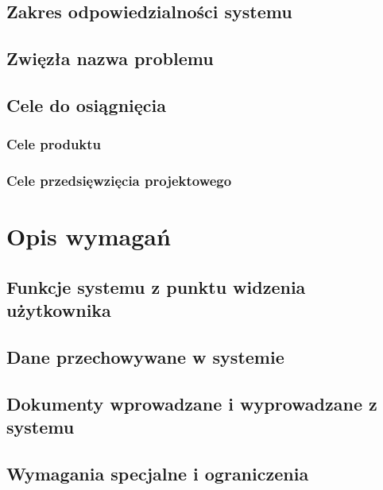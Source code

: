 \documentclass[paper=a4, fontsize=12pt]{scrartcl}
\numberwithin{equation}{section}		%
\numberwithin{figure}{section}			%
\numberwithin{table}{section}				%
\begin{document}
	\subsection{Zakres odpowiedzialności systemu}
		

	\subsection{Zwięzła nazwa problemu}
		

	\subsection{Cele do osiągnięcia}

		\subsubsection{Cele produktu}
			

		\subsubsection{Cele przedsięwzięcia projektowego}
			

\section{Opis wymagań}

	\subsection{Funkcje systemu z punktu widzenia użytkownika}
		

	\subsection{Dane przechowywane w systemie}
		

	\subsection{Dokumenty wprowadzane i wyprowadzane z systemu}
		

	\subsection{Wymagania specjalne i ograniczenia}
		
\end{document}

